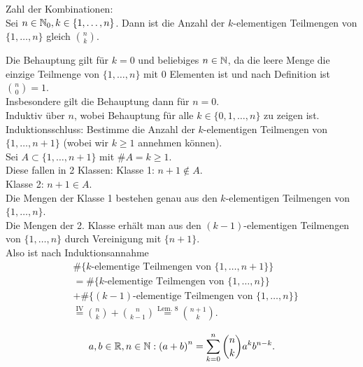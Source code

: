 \documentclass[../ana1.tex]{subfiles}
\begin{document}
\begin{satz}
	Zahl der Kombinationen: \\
	Sei \( n\in\mathbb{N}_0, k\in \{1,\ldots,n\} \). Dann ist die Anzahl der \(k \)-elementigen Teilmengen von \( \{1,\ldots,n\} \) gleich \( \binom{n}{k} \).
\end{satz}
\begin{bew}
	Die Behauptung gilt für \(k=0 \) und beliebiges \(n\in\mathbb{N} \), da die leere Menge die einzige Teilmenge von \( \{1,\ldots,n\} \) mit 0 Elementen ist und nach Definition ist \( \binom{n}{0} = 1 \). \\
	Insbesondere gilt die Behauptung dann für \(n=0 \). \\
	Induktiv über \(n \), wobei Behauptung für alle \(k\in \{0,1,\ldots,n\} \) zu zeigen ist. \\
	Induktionsschluss: Bestimme die Anzahl der \(k \)-elementigen Teilmengen von \( \{ 1,\ldots,n+1 \} \) (wobei wir \(k\geq 1 \) annehmen können). \\
	Sei \(A\subset \{1,\ldots,n+1\} \) mit \( \#A = k\geq 1 \). \\
	Diese fallen in 2 Klassen:
	Klasse 1: \(n+1 \notin A \). \\
	Klasse 2: \(n+1 \in A \). \\
	Die Mengen der Klasse 1 bestehen genau aus den \(k \)-elementigen Teilmengen von \( \{1,\ldots,n\} \). \\
	Die Mengen der 2. Klasse erhält man aus den \((k-1) \)-elementigen Teilmengen von \( \{1,\ldots,n\} \) durch Vereinigung mit \( \{n+1\} \). \\
	Also ist nach Induktionsannahme
	\begin{align*}
		 &  \# \{k\text{-elementige Teilmengen von } \{1,\ldots,n+1\} \}                                     \\
		 &= \# \{k\text{-elementige Teilmengen von } \{1,\ldots,n\} \}                                      \\
		 &+ \# \{(k-1)\text{-elementige Teilmengen von } \{1,\ldots,n\} \} \\
		 &  \overset{\text{IV}}{=} \binom{n}{k} + \binom{n}{k-1} \overset{\text{Lem. 8}}{=} \binom{n+1}{k}.
	\end{align*}
\end{bew}

\begin{satz}
	\[ a,b\in\mathbb{R},n\in\mathbb{N}:{(a+b)}^n = \sum_{k=0}^{n} \binom{n}{k} a^k b^{n-k}. \]
\end{satz}
\end{document}
